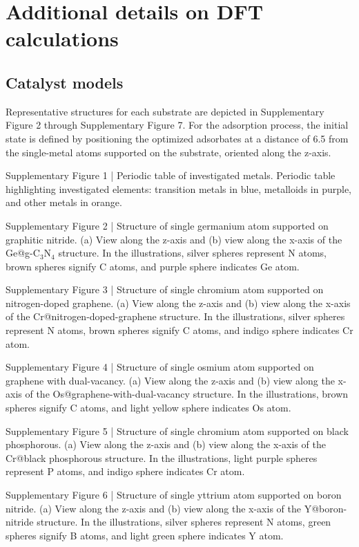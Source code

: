 

\section{Additional details on DFT calculations}


\subsection{Catalyst models}
Representative structures for each substrate are depicted in Supplementary Figure 2 through Supplementary Figure 7. For the adsorption process, the initial state is defined by positioning the optimized adsorbates at a distance of 6.5 \text{\AA} from the single-metal atoms supported on the substrate, oriented along the z-axis.


Supplementary Figure 1 | Periodic table of investigated metals. Periodic table highlighting investigated elements: transition metals in blue, metalloids in purple, and other metals in orange.


Supplementary Figure 2 | Structure of single germanium atom supported on graphitic nitride. (a) View along the z-axis and (b) view along the x-axis of the Ge@g-C$_3$N$_4$ structure. In the illustrations, silver spheres represent N atoms, brown spheres signify C atoms, and purple sphere indicates Ge atom.


Supplementary Figure 3 | Structure of single chromium atom supported on nitrogen-doped graphene. (a) View along the z-axis and (b) view along the x-axis of the Cr@nitrogen-doped-graphene structure. In the illustrations, silver spheres represent N atoms, brown spheres signify C atoms, and indigo sphere indicates Cr atom.


Supplementary Figure 4 | Structure of single osmium atom supported on graphene with dual-vacancy. (a) View along the z-axis and (b) view along the x-axis of the Os@graphene-with-dual-vacancy structure. In the illustrations, brown spheres signify C atoms, and light yellow sphere indicates Os atom.


Supplementary Figure 5 | Structure of single chromium atom supported on black phosphorous. (a) View along the z-axis and (b) view along the x-axis of the Cr@black phosphorous structure. In the illustrations, light purple spheres represent P atoms, and indigo sphere indicates Cr atom.


Supplementary Figure 6 | Structure of single yttrium atom supported on boron nitride. (a) View along the z-axis and (b) view along the x-axis of the Y@boron-nitride structure. In the illustrations, silver spheres represent N atoms, green spheres signify B atoms, and light green sphere indicates Y atom.


